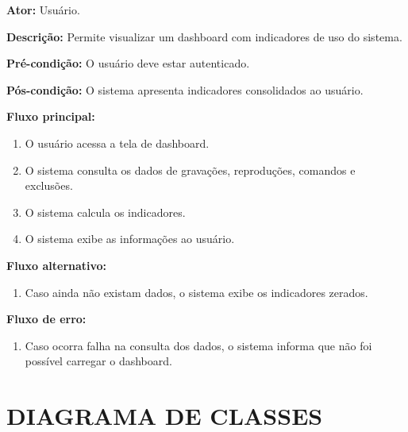 \documentclass[12pt,oneside,a4paper,brazil,final]{abntex2}
\begin{document}
\textbf{Ator:} Usuário.



\textbf{Descrição:} Permite visualizar um dashboard com indicadores de uso do sistema.



\textbf{Pré-condição:} O usuário deve estar autenticado.



\textbf{Pós-condição:} O sistema apresenta indicadores consolidados ao usuário.



\textbf{Fluxo principal:}

\begin{enumerate}

    \item O usuário acessa a tela de dashboard.

    \item O sistema consulta os dados de gravações, reproduções, comandos e exclusões.

    \item O sistema calcula os indicadores.

    \item O sistema exibe as informações ao usuário.

\end{enumerate}



\textbf{Fluxo alternativo:}

\begin{enumerate}

    \item Caso ainda não existam dados, o sistema exibe os indicadores zerados.

\end{enumerate}



\textbf{Fluxo de erro:}

\begin{enumerate}

    \item Caso ocorra falha na consulta dos dados, o sistema informa que não foi possível carregar o dashboard.

\end{enumerate}



\clearpage

\section{DIAGRAMA DE CLASSES}
\end{document}
